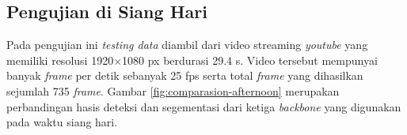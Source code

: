 \begin{table}[!h]
	\caption{Waktu Prediksi pada \textit{File Input} Video dalam \textit{MM:SS}}
	\label{tab:video-morning}
\end{table}

\subsection{Pengujian di Siang Hari}
\label{subsec:siang}

Pada pengujian ini \textit{testing data} diambil dari video streaming \textit{youtube}\citep{test-siang} yang memiliki resolusi 1920$\times$1080 px berdurasi 29.4 s. Video tersebut mempunyai banyak \textit{frame} per detik sebanyak 25 fps serta total \textit{frame} yang dihasilkan sejumlah 735 \textit{frame}. Gambar \ref{fig:comparasion-afternoon} merupakan perbandingan hasis deteksi dan segementasi dari ketiga \textit{backbone} yang digunakan pada waktu siang hari.

